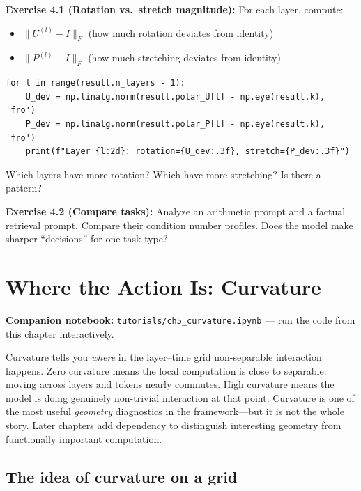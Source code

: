 \documentclass[11pt, twoside, openright]{memoir}
\newcommand{\notebook}[1]{%
  \begin{tcolorbox}[enhanced, colback=LBlue!30, colframe=Blue!60,
    left=4pt, right=4pt, top=3pt, bottom=3pt, boxrule=0.6pt, arc=2pt,
    before skip=6pt, after skip=10pt]
    {\small\sffamily\color{Navy} \textbf{Companion notebook:}
    \texttt{tutorials/#1} --- run the code from this chapter interactively.}
  \end{tcolorbox}%
}
\begin{document}
\begin{tryit}
\textbf{Exercise 4.1 (Rotation vs.\ stretch magnitude):} For each layer, compute:
\begin{itemize}[nosep]
\item $\|U^{(l)} - I\|_F$ (how much rotation deviates from identity)
\item $\|P^{(l)} - I\|_F$ (how much stretching deviates from identity)
\end{itemize}
\begin{lstlisting}
for l in range(result.n_layers - 1):
    U_dev = np.linalg.norm(result.polar_U[l] - np.eye(result.k), 'fro')
    P_dev = np.linalg.norm(result.polar_P[l] - np.eye(result.k), 'fro')
    print(f"Layer {l:2d}: rotation={U_dev:.3f}, stretch={P_dev:.3f}")
\end{lstlisting}
Which layers have more rotation? Which have more stretching? Is there a pattern?

\textbf{Exercise 4.2 (Compare tasks):} Analyze an arithmetic prompt and a
factual retrieval prompt. Compare their condition number profiles. Does the
model make sharper ``decisions'' for one task type?
\end{tryit}


\chapter{Where the Action Is: Curvature}
\label{chap:curvature}

\notebook{ch5\_curvature.ipynb}

\begin{whycare}
Curvature tells you \emph{where} in the layer--time grid non-separable
interaction happens. Zero curvature means the local computation is close to
separable: moving across layers and tokens nearly commutes. High curvature
means the model is doing genuinely non-trivial interaction at that point.
Curvature is one of the most useful \emph{geometry} diagnostics in the
framework---but it is not the whole story. Later chapters add dependency
to distinguish interesting geometry from functionally important computation.
\end{whycare}

\section{The idea of curvature on a grid}
\end{document}
